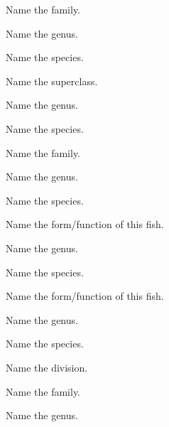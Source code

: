 \documentclass{exam}
\begin{document}
\begin{questions}

{\Large%
\question Name the family.
\vspace{0.5\baselineskip}

\question Name the genus.
\vspace{0.5\baselineskip}

\question Name the species.
\vspace{2\baselineskip}

\question Name the superclass.
\vspace{0.5\baselineskip}

\question Name the genus.
\vspace{0.5\baselineskip}

\question Name the species.
\vspace{2\baselineskip}


\question Name the family.
\vspace{0.5\baselineskip}

\question Name the genus.
\vspace{0.5\baselineskip}

\question Name the species.
\vspace{0.5\baselineskip}

\question Name the form/function of this fish.
\vspace{2\baselineskip}

\question Name the genus. 
\vspace{0.5\baselineskip}

\question Name the species.
\vspace{0.5\baselineskip}

\question Name the form/function of this fish.
\vspace{2\baselineskip}

\question Name the genus.
\vspace{0.5\baselineskip}

\question Name the species.
\vspace{2\baselineskip}

\newpage

\question Name the division.
\vspace{0.5\baselineskip}

\question Name the family.
\vspace{0.5\baselineskip}

\question Name the genus.
\vspace{0.5\baselineskip}

}
\end{questions}
\end{document}
